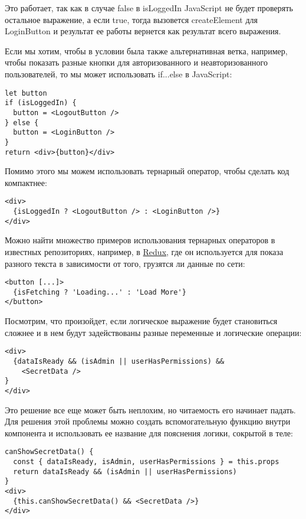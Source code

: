 Это работает, так как в случае false в isLoggedIn JavaScript не будет проверять остальное выражение, а если true, тогда вызовется createElement для LoginButton и результат ее работы вернется как результат всего выражения.

Если мы хотим, чтобы в условии была также альтернативная ветка, например, чтобы показать разные кнопки для авторизованного и неавторизованного пользователей, то мы может использовать if...else в JavaScript:

\begin{lstlisting}
let button
if (isLoggedIn) {
  button = <LogoutButton />
} else {
  button = <LoginButton />
}
return <div>{button}</div>
\end{lstlisting}
   
Помимо этого мы можем использовать тернарный оператор, чтобы сделать код компактнее:

\begin{lstlisting}
<div>
  {isLoggedIn ? <LogoutButton /> : <LoginButton />}
</div>
\end{lstlisting}

Можно найти множество примеров использования тернарных операторов в известных репозиториях, например, в \href{https://github.com/reactjs/redux/blob/master/examples/real-world/src/components/List.js\#L25}{Redux}, где он используется для показа разного текста в зависимости от того, грузятся ли данные по сети:

\begin{lstlisting}
<button [...]>
  {isFetching ? 'Loading...' : 'Load More'}
</button>
\end{lstlisting}

Посмотрим, что произойдет, если логическое выражение будет становиться сложнее и в нем будут задействованы разные переменные и логические операции:

\begin{lstlisting}
<div>
  {dataIsReady && (isAdmin || userHasPermissions) && 
    <SecretData />
}
</div>
\end{lstlisting}

Это решение все еще может быть неплохим, но читаемость его начинает падать. Для решения этой проблемы можно создать вспомогательную функцию внутри компонента и использовать ее название для пояснения логики, сокрытой в теле:

\begin{lstlisting}
canShowSecretData() {
  const { dataIsReady, isAdmin, userHasPermissions } = this.props
  return dataIsReady && (isAdmin || userHasPermissions)
}
<div>
  {this.canShowSecretData() && <SecretData />}
</div>
\end{lstlisting}

